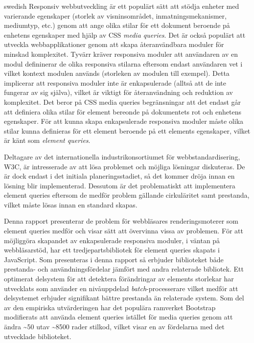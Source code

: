 \documentclass[a4paper,11pt]{kth-mag}
\begin{document}
  \clearpage
  \begin{foreignabstract}{swedish}
    Responsiv webbutveckling är ett populärt sätt att stödja enheter med varierande egenskaper (storlek av visninsområdet, inmatningsmekanismer, mediumtyp, etc.) genom att ange olika stilar för ett dokument beroende på enhetens egenskaper med hjälp av CSS \emph{media queries}.
    Det är också populärt att utveckla webbapplikationer genom att skapa återanvändbara moduler för minskad komplexitet.
    Tyvärr kräver responsiva moduler att användaren av en modul defininerar de olika responsiva stilarna eftersom endast användaren vet i vilket kontext modulen används (storleken av modulen till exempel).
    Detta implicerar att responsiva moduler inte är enkapsulerade (alltså att de inte fungerar av sig själva), vilket är viktigt för återanvändning och reduktion av komplexitet.
    Det beror på CSS media queries begränsningar att det endast går att definiera olika stilar för element bereonde på dokumentets rot och enhetens egenskaper.
    För att kunna skapa enkapsulerade responsiva moduler måste olika stilar kunna definieras för ett element beroende på ett elements egenskaper, vilket är känt som \emph{element queries}.

    Deltagare av det internationella industrikonsortiumet för webbstandardisering, W3C, är intresserade av att lösa problemet och möjliga lösningar diskuteras.
    De är dock endast i det initiala planeringsstadiet, så det kommer dröja innan en lösning blir implementerad.
    Dessutom är det problematiskt att implementera element queries eftersom de medför problem gällande cirkuläritet samt prestanda, vilket måste lösas innan en standard skapas.

    Denna rapport presenterar de problem för webbläsares renderingsmoterer som element queries medför och visar sätt att övervinna vissa av problemen.
    För att möjliggöra skapandet av enkapsulerade responsiva moduler, i väntan på webbläsarstöd, har ett tredjepartsbibliotek för element queries skapats i JavaScript.
    Som presenteras i denna rapport så erbjuder biblioteket både prestanda- och användningsfördelar jämfört med andra relaterade bibliotek.
    Ett optimerat delsystem för att detektera förändringar av elements storlekar har utvecklats som använder en nivåuppdelad \emph{batch}-processerare vilket medför att delsystemet erbjuder signifikant bättre prestanda än relaterade system.
    Som del av den empiriska utvärderingen har det populära ramverket Bootstrap modifierats att använda element queries istället för media queries genom att ändra \textasciitilde50 utav \textasciitilde8500 rader stilkod, vilket visar en av fördelarna med det utvecklade biblioteket.

  \end{foreignabstract}
  \clearpage
\end{document}
